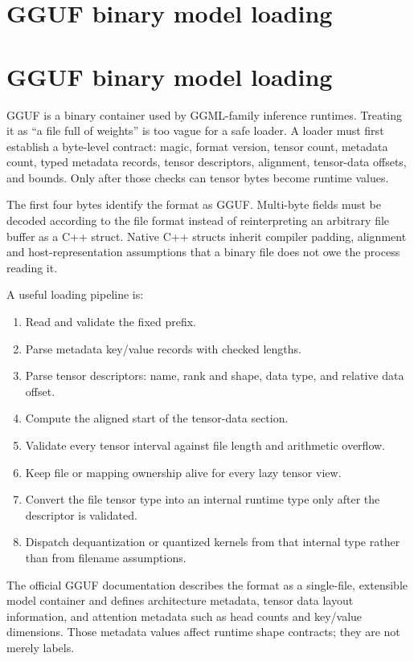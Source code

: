 \hypertarget{appendix-fef72dd246f2}{}
\section*{GGUF binary model loading}
\section{GGUF binary model loading}\label{gguf-binary-model-loading}

GGUF is a binary container used by GGML-family inference runtimes. Treating it as ``a file full of weights'' is too vague for a safe loader. A loader must first establish a byte-level contract: magic, format version, tensor count, metadata count, typed metadata records, tensor descriptors, alignment, tensor-data offsets, and bounds. Only after those checks can tensor bytes become runtime values.

The first four bytes identify the format as GGUF. Multi-byte fields must be decoded according to the file format instead of reinterpreting an arbitrary file buffer as a C++ struct. Native C++ structs inherit compiler padding, alignment and host-representation assumptions that a binary file does not owe the process reading it.

A useful loading pipeline is:

\begin{enumerate}
\def\labelenumi{\arabic{enumi}.}
\tightlist
\item
  Read and validate the fixed prefix.
\item
  Parse metadata key/value records with checked lengths.
\item
  Parse tensor descriptors: name, rank and shape, data type, and relative data offset.
\item
  Compute the aligned start of the tensor-data section.
\item
  Validate every tensor interval against file length and arithmetic overflow.
\item
  Keep file or mapping ownership alive for every lazy tensor view.
\item
  Convert the file tensor type into an internal runtime type only after the descriptor is validated.
\item
  Dispatch dequantization or quantized kernels from that internal type rather than from filename assumptions.
\end{enumerate}

The official GGUF documentation describes the format as a single-file, extensible model container and defines architecture metadata, tensor data layout information, and attention metadata such as head counts and key/value dimensions. Those metadata values affect runtime shape contracts; they are not merely labels.

